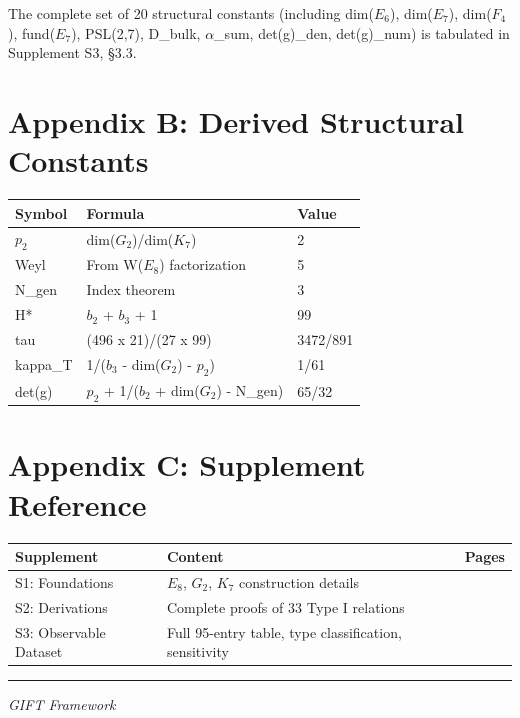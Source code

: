 \documentclass[11pt,a4paper]{article}
\begin{document}
The complete set of 20 structural constants (including dim(\(E_{6}\)),
dim(\(E_{7}\)), dim(\(F_{4}\)), fund(\(E_{7}\)),
\textbar PSL(2,7)\textbar, D\_bulk, \(\alpha\)\_sum, det(g)\_den,
det(g)\_num) is tabulated in Supplement S3, §3.3.

\section{Appendix B: Derived Structural Constants}

\begin{longtable}[]{@{}lll@{}}
\toprule\noalign{}
Symbol & Formula & Value \\
\midrule\noalign{}
\endhead
\bottomrule\noalign{}
\endlastfoot
\(p_{2}\) & dim(\(G_{2}\))/dim(\(K_{7}\)) & 2 \\
Weyl & From W(\(E_{8}\)) factorization & 5 \\
N\_gen & Index theorem & 3 \\
H* & \(b_{2}\) + \(b_{3}\) + 1 & 99 \\
tau & (496 x 21)/(27 x 99) & 3472/891 \\
kappa\_T & 1/(\(b_{3}\) - dim(\(G_{2}\)) - \(p_{2}\)) & 1/61 \\
det(g) & \(p_{2}\) + 1/(\(b_{2}\) + dim(\(G_{2}\)) - N\_gen) & 65/32 \\
\end{longtable}


\section{Appendix C: Supplement Reference}

\begin{longtable}[]{@{}
  >{\raggedright\arraybackslash}p{}
  >{\raggedright\arraybackslash}p{}
  >{\raggedright\arraybackslash}p{}@{}}
\toprule\noalign{}
\begin{minipage}[b]{\linewidth}\raggedright
Supplement
\end{minipage} & \begin{minipage}[b]{\linewidth}\raggedright
Content
\end{minipage} & \begin{minipage}[b]{\linewidth}\raggedright
Pages
\end{minipage} \\
\midrule\noalign{}
\endhead
\bottomrule\noalign{}
\endlastfoot
S1: Foundations & \(E_{8}\), \(G_{2}\), \(K_{7}\) construction details &
27 \\
S2: Derivations & Complete proofs of 33 Type I relations &
42 \\
S3: Observable Dataset & Full 95-entry table, type classification,
sensitivity & 10 \\
\end{longtable}


\noindent

\rule{\textwidth}{0.2pt}

\emph{GIFT Framework}
\end{document}
